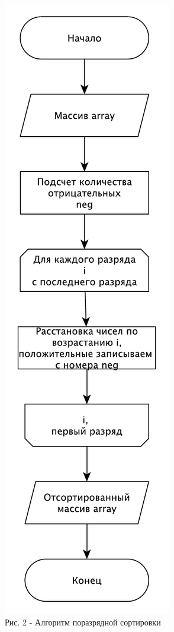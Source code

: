 \documentclass[a4paper,14pt]{article} %
\begin{document}
        \begin{center}
        		\includegraphics[scale = 0.8]{shema1} \\ Рис. 2 - Алгоритм поразрядной сортировки
	\end{center}
	
\end{document}
